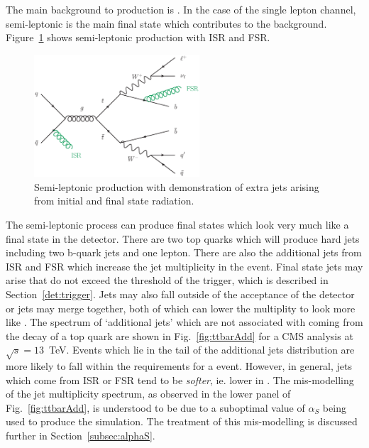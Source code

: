 The main background to \tttt production is \ttbar. In the case of the single lepton channel, semi-leptonic \ttbar is the main final state which contributes to the background. Figure~\ref{fig:ttbarback} shows semi-leptonic \ttbar production with ISR and FSR.

\begin{figure}[ht!]
\begin{center}
    \includegraphics[width=0.55\textwidth]{images/Theory/ttbarISRFSR3.eps}
    \caption{Semi-leptonic \ttbar production with demonstration of extra jets arising from initial and final state radiation.}
    \label{fig:ttbarback}
\end{center}
\end{figure}

The semi-leptonic \ttbar process can produce final states which look very much like a \tttt final state in the detector. There are two top quarks which will produce hard jets including two b-quark jets and one lepton. There are also the additional jets from ISR and FSR which increase the jet multiplicity in the event. Final state jets may arise that do not exceed the \pt threshold of the trigger, which is described in Section~\ref{det:trigger}. Jets may also fall outside of the acceptance of the detector or jets may merge together, both of which can lower the \tttt multiplity to look more like \ttbar. 
The spectrum of `additional jets' which are not associated with coming from the decay of a top quark are shown in Fig.~\ref{fig:ttbarAdd} for a CMS analysis at $\sqrt{s}=13$~TeV. Events which lie in the tail of the additional jets distribution are more likely to fall within the requirements for a \tttt event. However, in general, jets which come from ISR or FSR tend to be \emph{softer}, ie. lower in \pt. The mis-modelling of the jet multiplicity spectrum, as observed in the lower panel of Fig.~\ref{fig:ttbarAdd}, is understood to be due to a suboptimal value of $\alpha_S$ being used to produce the \ttbar simulation. The treatment of this mis-modelling is discussed further in Section~\ref{subsec:alphaS}.

